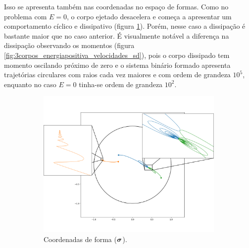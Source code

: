 Isso se apresenta também nas coordenadas no espaço de formas. Como no problema com $E=0$, o corpo ejetado desacelera e começa a apresentar um comportamento cíclico e dissipativo (figura \ref{fig:3corpos_energiapositiva_posicoes_sd}). Porém, nesse caso a dissipação é bastante maior que no caso anterior. É visualmente notável a diferença na dissipação observando os momentos (figura \ref{fig:3corpos_energiapositiva_velocidades_sd}), pois o corpo dissipado tem momento oscilando próximo de zero e o sistema binário formado apresenta trajetórias circulares com raios cada vez maiores e com ordem de grandeza $10^5$, enquanto no caso $E=0$ tinha-se ordem de grandeza $10^2$.

\begin{figure}[H]
    \centering
    \begin{subfigure}{.5\textwidth}
        \centering
        \includegraphics[width=\linewidth]{tcc//img/3corpos_energiapositiva_posicoes_sd_zoom.png}
        \caption{Coordenadas de forma ($\bm \sigma$).}
        \label{fig:3corpos_energiapositiva_posicoes_sd}
    \end{subfigure}%
    \begin{subfigure}{.5\textwidth}
        \centering

\end{subfigure}
\end{figure}
